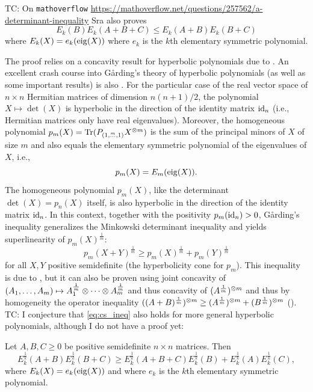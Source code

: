 \documentclass[notitlepage, 10pt]{article}
\begin{document}
{\color{blue}
TC: On \texttt{mathoverflow} \url{https://mathoverflow.net/questions/257562/a-determinant-inequality}
Sra also proves
\begin{equation}
    E_k(B)E_k(A+B+C) \leq E_k(A+B) E_k(B+C)
\end{equation}
where $E_k(X) = e_{k}(\operatorname{eig}(X))$ where $e_k$ is the $k$th elementary symmetric polynomial.

The proof relies on a concavity result for hyperbolic polynomials due to \citeauthor{bauschke2001hyperbolic} \cite{bauschke2001hyperbolic}.
An excellent crash course into Gårding's theory of hyperbolic polynomials (as well as some important results) is also \cite{bauschke2001hyperbolic}.
For the particular case of the real vector space of $n\times n$ Hermitian matrices of dimension $n(n+1)/2$, the polynomial $X \mapsto \det(X)$ is hyperbolic in the direction of the identity matrix $\operatorname{id}_n$ (i.e., Hermitian matrices only have real eigenvalues).
Moreover, the homogeneous polynomial $p_m(X) = \operatorname{Tr}(P_{(1,\stackrel{m}{\ldots}, 1)}X^{\otimes m})$ is the sum of the principal minors of $X$ of size $m$ and also equals the elementary symmetric polynomial of the eigenvalues of $X$, i.e.,
\begin{equation}
    p_m(X) = E_m (\operatorname{eig}(X)).
\end{equation}
The homogeneous polynomial $p_m(X)$, like the determinant $\det(X) = p_n(X)$ itself, is also hyperbolic in the direction of the identity matrix $\operatorname{id}_n$.
In this context, together with the positivity $p_m(\operatorname{id}_n) > 0$, Gårding's inequality generalizes the Minkowski determinant inequality and yields superlinearity of $p_m(X)^{\frac{1}{m}}$:
\begin{equation}
    p_{m}(X+Y)^{\frac{1}{m}} \geq p_m(X)^{\frac{1}{m}} + p_m(Y)^{\frac{1}{m}}
\end{equation}
for all $X,Y$ positive semidefinite (the hyperbolicity cone for $p_m$).
This inequality is due to \citeauthor{marcus1957inequalities} \cite[Theorem 2]{marcus1957inequalities},
but it can also be proven using joint concavity of $(A_1,\ldots, A_m)\mapsto A_1^{\frac{1}{m}}\otimes \cdots \otimes A_m^{\frac{1}{m}}$ and thus concavity of $(A^{\frac{1}{m}})^{\otimes m}$ and thus by homogeneity the operator inequality $((A+B)^{\frac{1}{m}})^{\otimes m} \geq (A^{\frac{1}{m}})^{\otimes m} + (B^{\frac{1}{m}})^{\otimes m}$ (\cite[Exercise 4.2.9]{bhatia2009positive}).
TC: I conjecture that \cref{eq:cs_ineq} also holds for more general hyperbolic polynomials, although I do not have a proof yet:
\begin{conj}
    Let $A,B,C \geq 0$ be positive semidefinite $n\times n$ matrices.
    Then
    \begin{equation}
        \label{eq:cs_ineq_conjecture}
        E_k^{\frac{1}{k}}(A+B) E_k^{\frac{1}{k}}(B+C) \geq E_k^{\frac{1}{k}}(A+B+C)E_k^{\frac{1}{k}}(B) + E_k^{\frac{1}{k}}(A) E_k^{\frac{1}{k}}(C),
    \end{equation}
    where $E_k(X) = e_{k}(\operatorname{eig}(X))$ and where $e_k$ is the $k$th elementary symmetric polynomial.
\end{conj}
}
\end{document}
